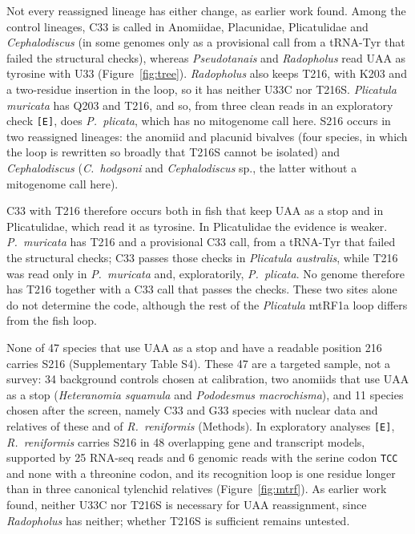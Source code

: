 \documentclass[11pt, a4paper]{article}
\begin{document}
Not every reassigned lineage has either change, as earlier work found. Among the control lineages, C33 is called in Anomiidae, Placunidae, Plicatulidae and \textit{Cephalodiscus} (in some genomes only as a provisional call from a tRNA-Tyr that failed the structural checks), whereas \textit{Pseudotanais} and \textit{Radopholus} read UAA as tyrosine with U33 (Figure~\ref{fig:tree}). \textit{Radopholus} also keeps T216, with K203 and a two-residue insertion in the loop, so it has neither U33C nor T216S. \textit{Plicatula muricata} has Q203 and T216, and so, from three clean reads in an exploratory check \texttt{[E]}, does \textit{P.\ plicata}, which has no mitogenome call here. S216 occurs in two reassigned lineages: the anomiid and placunid bivalves (four species, in which the loop is rewritten so broadly that T216S cannot be isolated) and \textit{Cephalodiscus} (\textit{C.\ hodgsoni} and \textit{Cephalodiscus} sp., the latter without a mitogenome call here).

C33 with T216 therefore occurs both in fish that keep UAA as a stop and in Plicatulidae, which read it as tyrosine. In Plicatulidae the evidence is weaker. \textit{P.\ muricata} has T216 and a provisional C33 call, from a tRNA-Tyr that failed the structural checks; C33 passes those checks in \textit{Plicatula australis}, while T216 was read only in \textit{P.\ muricata} and, exploratorily, \textit{P.\ plicata}. No genome therefore has T216 together with a C33 call that passes the checks. These two sites alone do not determine the code, although the rest of the \textit{Plicatula} mtRF1a loop differs from the fish loop.

None of 47 species that use UAA as a stop and have a readable position 216 carries S216 (Supplementary Table S4). These 47 are a targeted sample, not a survey: 34 background controls chosen at calibration, two anomiids that use UAA as a stop (\textit{Heteranomia squamula} and \textit{Pododesmus macrochisma}), and 11 species chosen after the screen, namely C33 and G33 species with nuclear data and relatives of these and of \textit{R.\ reniformis} (Methods). In exploratory analyses \texttt{[E]}, \textit{R.\ reniformis} carries S216 in 48 overlapping gene and transcript models, supported by 25 RNA-seq reads and 6 genomic reads with the serine codon \texttt{TCC} and none with a threonine codon, and its recognition loop is one residue longer than in three canonical tylenchid relatives (Figure~\ref{fig:mtrf}). As earlier work found, neither U33C nor T216S is necessary for UAA reassignment, since \textit{Radopholus} has neither; whether T216S is sufficient remains untested.
\end{document}

